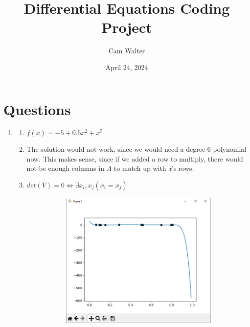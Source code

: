 \documentclass{article}
\title{Differential Equations Coding Project}
\author{Cam Walter}
\date{April 24, 2024}
\begin{document}
\maketitle

\section*{Questions}

\begin{enumerate}
      \item
            \begin{enumerate}
                  \item \begin{math}
                              f(x) = -5 + 0.5x^2 + x^5
                        \end{math}
                  \item The solution would not work, since we would need a degree 6
                        polynomial now. This makes sense, since if we added a row to multiply,
                        there would not be enough columns in \textit{A} to match up with \textit{x}'s rows.
                  \item \begin{math}
                              det(V)=0 \iff \exists x_i, x_j (x_i=x_j)
                        \end{math}
                        \begin{figure}[h]
                              \centering
                              \begin{subfigure}{.5\textwidth}
                                    \includegraphics[width=\textwidth, keepaspectratio]{zoomed_out.png}

\end{subfigure}
\end{figure}
\end{enumerate}
\end{enumerate}
\end{document}
